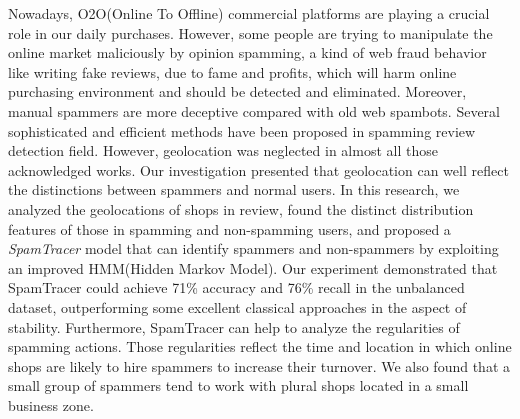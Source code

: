 \begin{englishabstract}

Nowadays, O2O(Online To Offline) commercial platforms are playing a crucial role in our daily purchases. However, some people are trying to manipulate the online market maliciously by opinion spamming, a kind of web fraud behavior like writing fake reviews, due to fame and profits, which will harm online purchasing environment and should be detected and eliminated. Moreover, manual spammers are more deceptive compared with old web spambots. Several sophisticated and efficient methods have been proposed in spamming review detection field. However, geolocation was neglected in almost all those acknowledged works. Our investigation presented that geolocation can well reflect the distinctions between spammers and normal users. In this research, we analyzed the geolocations of shops in review, found the distinct distribution features of those in spamming and non-spamming users, and proposed a \emph{SpamTracer} model that can identify spammers and non-spammers by exploiting an improved HMM(Hidden Markov Model). Our experiment demonstrated that SpamTracer could achieve 71\% accuracy and 76\% recall in the unbalanced dataset, outperforming some excellent classical approaches in the aspect of stability. Furthermore, SpamTracer can help to analyze the regularities of spamming actions. Those regularities reflect the time and location in which online shops are likely to hire spammers to increase their turnover. We also found that a small group of spammers tend to work with plural shops located in a small business zone.

\end{englishabstract}

